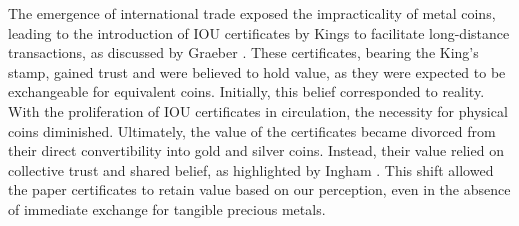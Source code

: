 The emergence of international trade exposed the impracticality of metal coins, leading to the introduction of IOU certificates by Kings to
facilitate long-distance transactions, as discussed by Graeber \cite{graeber2011}. These certificates, bearing the King's stamp, gained trust
and were believed to hold value, as they were expected to be exchangeable for equivalent coins. Initially, this belief corresponded to reality.
With the proliferation of IOU certificates in circulation, the necessity for physical coins diminished. Ultimately, the value of the certificates
became divorced from their direct convertibility into gold and silver coins. Instead, their value relied on collective trust and shared belief,
as highlighted by Ingham \cite{ingham2004}. This shift allowed the paper certificates to retain value based on our perception, even in the
absence of immediate exchange for tangible precious metals.

